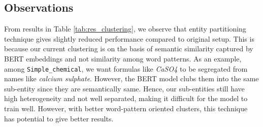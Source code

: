 \subsection{Observations}
From results in Table \ref{tab:res_clustering}, we observe that entity partitioning technique gives slightly reduced performance compared to original setup. This is because our current clustering is on the basis of semantic similarity captured by BERT embeddings and not similarity among word patterns. As an example, among \texttt{Simple\_chemical}, we want formulas like \textit{CaSO4} to be segregated from names like \textit{calcium sulphate}. However, the BERT model clubs them into the same sub-entity since they are semantically same. Hence, our sub-entities still have high heterogeneity and not well separated, making it difficult for the model to train well. However, with better word-pattern oriented clusters, this technique has potential to give better results.




